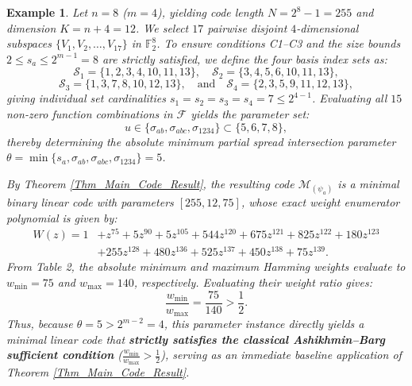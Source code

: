 \documentclass[pdflatex,sn-mathphys-num]{sn-jnl}%
\theoremstyle{thmstyleone}%
\theoremstyle{thmstyletwo}%
\newtheorem{example}{Example}%
\theoremstyle{thmstylethree}%
\begin{document}
\begin{example}\label{ex:AB_strictly_greater}
Let $n = 8$ ($m = 4$), yielding code length $N = 2^8 - 1 = 255$ and dimension $K = n + 4 = 12$. We select $17$ pairwise disjoint $4$-dimensional subspaces $\{V_1, V_2, \ldots, V_{17}\}$ in $\mathbb{F}_2^8$. To ensure conditions C1--C3 and the size bounds $2 \le s_a \le 2^{m-1} = 8$ are strictly satisfied, we define the four basis index sets as:
\[
\mathcal{S}_1 = \{1, 2, 3, 4, 10, 11, 13\}, \quad \mathcal{S}_2 = \{3, 4, 5, 6, 10, 11, 13\},
\]
\[
\mathcal{S}_3 = \{1, 3, 7, 8, 10, 12, 13\}, \quad \text{and} \quad \mathcal{S}_4 = \{2, 3, 5, 9, 11, 12, 13\},
\]
giving individual set cardinalities $s_1 = s_2 = s_3 = s_4 = 7 \le 2^{4-1}$.
Evaluating all $15$ non-zero function combinations in $\mathcal{F}$ yields the parameter set:
\[
u \in \{\sigma_{ab}, \sigma_{abc}, \sigma_{1234}\} \subset \{5, 6, 7, 8\},
\]
thereby determining the absolute minimum partial spread intersection parameter $\theta = \min \{s_a, \sigma_{ab}, \sigma_{abc}, \sigma_{1234}\} = 5$.

By Theorem \ref{Thm_Main_Code_Result}, the resulting code $\mathcal{M}_{(\psi_a)}$ is a minimal binary linear code with parameters $[255, 12, 75]$, whose exact weight enumerator polynomial is given by:
\[
\begin{aligned}
W(z) = 1 &+ z^{75} + 5z^{90} + 5z^{105} + 544z^{120} + 675z^{121} + 825z^{122} + 180z^{123} \\
&+ 255z^{128} + 480z^{136} + 525z^{137} + 450z^{138} + 75z^{139}.
\end{aligned}
\] From Table 2, the absolute minimum and maximum Hamming weights evaluate to $w_{\min} = 75$ and $w_{\max} = 140$, respectively. Evaluating their weight ratio gives:
\[
\frac{w_{\min}}{w_{\max}} = \frac{75}{140} > \frac{1}{2}.
\]
Thus, because $\theta = 5 > 2^{m-2} = 4$, this parameter instance directly yields a minimal linear code that \textbf{strictly satisfies the classical Ashikhmin--Barg sufficient condition} ($\frac{w_{\min}}{w_{\max}} > \frac{1}{2}$), serving as an immediate baseline application of Theorem \ref{Thm_Main_Code_Result}. 

\end{example}
\end{document}
